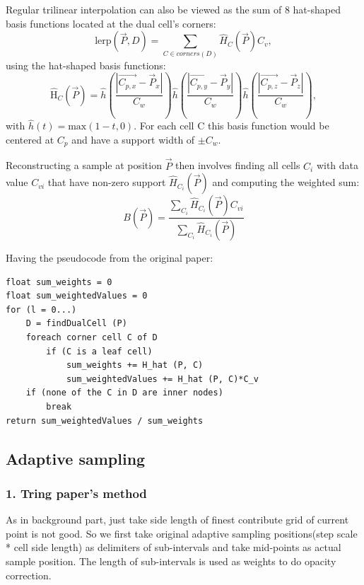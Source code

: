 \documentclass[acmtog]{acmart}
\begin{document}
Regular trilinear interpolation can also be viewed as the sum of 8 hat-shaped basis functions located at the dual cell’s corners:
\[\mathrm{lerp}(\vec{P},D)=\sum_{C\in corners(D)}\hat{H}_{C}(\vec{P})C_{v},\]
using the hat-shaped basis functions:
\[\hat{\mathrm H}_{C} (\vec{P}) = \hat{h}\left(\frac{|\vec{C_{p,x}}-\vec{P}_{x}|}{C_{w}}\right) \hat{h}\left(\frac{|\vec{C_{p,y}}-\vec{P}_{y}|}{C_{w}}\right) \hat{h}\left(\frac{|\vec{C_{p,z}}-\vec{P}_{z}|}{C_{w}}\right),\]
with $\hat{h}(t) = \text{max}(1 - t, 0)$. For each cell C this basis function would be centered at $C_p$ and have a support width of $\pm C_w$.


Reconstructing a sample at position $\vec{P}$ then involves finding all cells $C_i$ with data value $C_{vi}$ that have non-zero support $\hat{H}_{C_i}(\vec{P})$ and computing the weighted sum:
\[B(\vec{P})=\frac{\sum_{C_{i}}\hat{H}_{C_{i}}(\vec{P})C_{vi}}{\sum_{C_{i}}\hat{H}_{C_{i}}(\vec{P})}\]


Having the pseudocode from the original paper:
\begin{lstlisting}
float sum_weights = 0
float sum_weightedValues = 0
for (l = 0...)
	D = findDualCell (P)
	foreach corner cell C of D
		if (C is a leaf cell)
			sum_weights += H_hat (P, C)
			sum_weightedValues += H_hat (P, C)*C_v
	if (none of the C in D are inner nodes)
		break
return sum_weightedValues / sum_weights
\end{lstlisting}


\subsection{Adaptive sampling}


\subsubsection{1. Tring paper's method}


As in background part, just take side length of finest contribute grid of current point is not good. So we first take original adaptive sampling positions(step scale * cell side length) as delimiters of sub-intervals and take mid-points as actual sample position. The length of sub-intervals is used as weights to do opacity correction.
\end{document}
